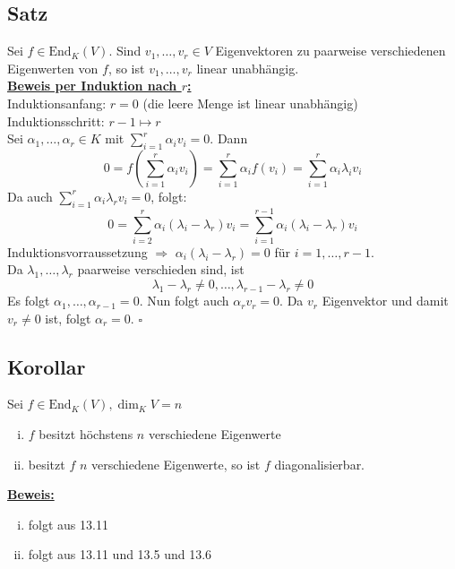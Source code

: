 \subsection{Satz} %
\label{sub:satz}
Sei $f \in \text{End}_K (V)$. Sind $v_1, \ldots , v_r \in V$ Eigenvektoren zu paarweise verschiedenen Eigenwerten von $f$, so ist $v_1, \ldots , v_r$ linear unabhängig.
\vspace{10pt} \\
\underline{\textbf{Beweis per Induktion nach $r$:}} \\
Induktionsanfang: $r=0$ (die leere Menge ist linear unabhängig)
\vspace{7pt} \\
Induktionsschritt: $r-1 \mapsto r$ \\
Sei $\alpha_1, \ldots , \alpha_r \in K$ mit $\sum\limits_{i=1}^{r} \alpha_i v_i = 0$. Dann
\[
	0= f \left( \sum\limits_{i=1}^{r} \alpha_i v_i \right) = \sum\limits_{i=1}^{r} \alpha_i f(v_i)= \sum\limits_{i=1}^{r} \alpha_i \lambda_i v_i  
\]
Da auch $\sum\limits_{i=1}^{r} \alpha_i \lambda_r v_i = 0 $, folgt:
\[
	0 = \sum\limits_{i=2}^{r} \alpha_i (\lambda_i - \lambda_r) v_i = \sum\limits_{i=1}^{r-1} \alpha_i (\lambda_i - \lambda_r) v_i
\]
Induktionsvorraussetzung $\Rightarrow$ $\alpha_i (\lambda_i - \lambda_r)=0$ für $i= 1, \ldots , r-1$. \\
Da $\lambda_1, \ldots , \lambda_r$ paarweise verschieden sind, ist 
\[
	\lambda_1 - \lambda_r \not= 0 , \ldots , \lambda_{r-1} - \lambda_r \not= 0
\]
Es folgt $\alpha_1, \ldots , \alpha_{r-1} = 0$. Nun folgt auch $\alpha_r v_r = 0$. Da $v_r$ Eigenvektor und 
damit $v_r \not= 0 $ ist, folgt $\alpha_r = 0$. \hfill \( \square \)

\subsection{Korollar} %
\label{sub:korollar}
Sei $f \in \text{End}_K (V), \dim_K V = n$
\begin{enumerate}[(i)]
	\item $f$ besitzt höchstens $n$ verschiedene Eigenwerte
	\item besitzt $f$ $n$ verschiedene Eigenwerte, so ist $f$ diagonalisierbar.
\end{enumerate}
\underline{\textbf{Beweis:}} 
\begin{enumerate}[(i)]
	\item folgt aus 13.11
	\item folgt aus 13.11 und 13.5 und 13.6
\end{enumerate}

